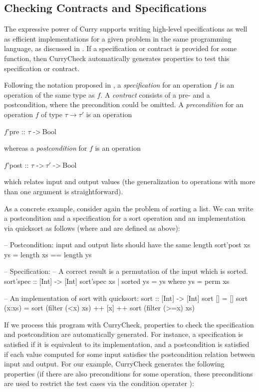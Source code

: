 \subsection{Checking Contracts and Specifications}
\label{sec:currycheck:contracts}

The expressive power of Curry supports
writing high-level specifications
as well as efficient implementations for a given problem
in the same programming language,
as discussed in \cite{AntoyHanus12PADL}.
If a specification or contract is provided for some function,
then CurryCheck automatically generates properties
to test this specification or contract.

Following the notation proposed in \cite{AntoyHanus12PADL},
a \emph{specification}
for an operation $f$ is an operation 
of the same type as $f$.
A \emph{contract} consists
of a pre- and a postcondition, where the precondition could be omitted.
A \emph{precondition} for an operation $f$
of type $\tau \to \tau'$ is an operation
\begin{curry}
$f$'pre :: $\tau$ ->$~$Bool
\end{curry}
whereas
a \emph{postcondition} for $f$
is an operation
\begin{curry}
$f$'post :: $\tau$ ->$~\tau'$ ->$~$Bool
\end{curry}
which relates input and output values
(the generalization to operations with more than one argument
is straightforward).

As a concrete example, consider again the problem of sorting a list.
We can write a postcondition and a specification for
a sort operation  and an implementation via quicksort
as follows (where  and 
are defined as above):

\begin{curry}
-- Postcondition: input and output lists should have the same length
sort'post xs ys = length xs == length ys

-- Specification:
-- A correct result is a permutation of the input which is sorted.
sort'spec :: [Int] -> [Int]
sort'spec xs | sorted ys = ys  where ys = perm xs

-- An implementation of sort with quicksort:
sort :: [Int] -> [Int]
sort []     = []
sort (x:xs) = sort (filter (<x) xs) ++ [x] ++ sort (filter (>=x) xs)
\end{curry}
%
If we process this program with CurryCheck,
properties to check the specification and postcondition
are automatically generated. For instance,
a specification is satisfied if it is equivalent to its
implementation, and a postcondition is satisfied
if each value computed for some input satisfies the postcondition
relation between input and output. For our example, CurryCheck generates
the following properties (if there are also
preconditions for some operation, these preconditions are used
to restrict the test cases via the condition operater \ccode{==>}):

